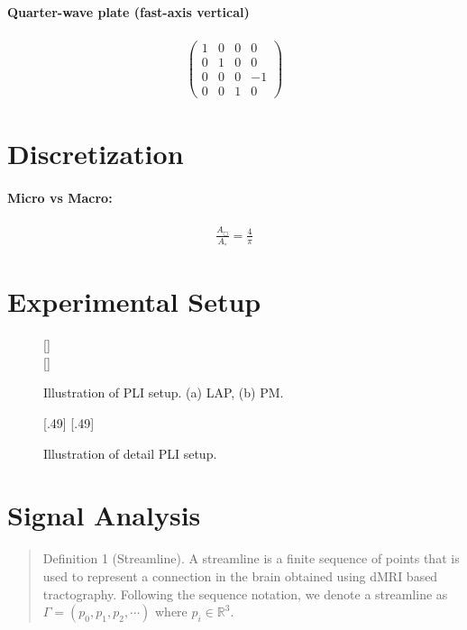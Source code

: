 \paragraph{Quarter-wave plate (fast-axis vertical)}
\begin{align}
\begin{pmatrix}
    1 & 0 & 0 &  0 \\
    0 & 1 & 0 &  0 \\
    0 & 0 & 0 & -1 \\
    0 & 0 & 1 &  0
\end{pmatrix}
\end{align}
% 
% 
\section{Discretization}
\paragraph{Micro vs Macro:}
% 
\begin{align}
    \frac{A_{\Box}}{A_{\circ}} = \frac{4}{\pi}
\end{align}
% 
\section{Experimental Setup}
%
\begin{figure}[!t]
    \captionsetup[sub]{position=top}
    \def\tikzwidth{\textwidth}
	\centering
	\subcaptionbox{}[\textwidth]{
	}\\
	\subcaptionbox{}[\textwidth]{
	}
	\caption{Illustration of PLI setup. (a) LAP, (b) PM.}
	\label{fig:pli_setup}
\end{figure}
%
\begin{figure}[!t]
    \def\tikzwidth{0.49*\textwidth}
	\centering
	[.49\textwidth]{
			}\hfill
	[.49\textwidth]{
			}
	\label{fig:pli_detail}
	\caption{Illustration of detail PLI setup.}
\end{figure}
%
% 
\section{Signal Analysis}
% 
\begin{quote}
Definition 1 (Streamline).
A streamline is a finite sequence of points that is used to represent a connection in the brain obtained using dMRI based tractography.
Following the sequence notation, we denote a streamline as $\Gamma = (p_0, p_1, p_2, \cdots )$ where $p_i \in \mathbb{R}^3$. %
\end{quote}

